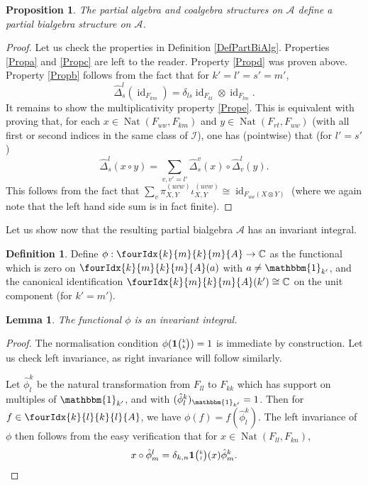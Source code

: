 \documentclass[10pt]{article}
\DeclareMathOperator{\id}{id}
\DeclareMathOperator{\Nat}{\mathrm{Nat}}
\newcommand{\C}{\mathbb{C}}
\newcommand{\Grt}[3]{#1{\tiny{\begin{pmatrix} #2\\#3\end{pmatrix}}}}
\newcommand{\Unitb}{\mathbbm{1}}
\newcommand{\UnitC}[2]{\Grt{\mathbf{1}}{#1}{#2}}
\newcommand{\Gr}[5]{\fourIdx{#2}{#4}{#3}{#5}{#1}}%
\newtheorem{Lem}[Theorem]{Lemma}
\newtheorem{Prop}[Theorem]{Proposition}
\theoremstyle{definition}
\newtheorem{Def}[Theorem]{Definition}
\numberwithin{equation}{section}
\begin{document}
\begin{Prop} The partial algebra and coalgebra structures on $\mathscr{A}$ define a partial bialgebra structure on $\mathscr{A}$. 
\end{Prop}
\begin{proof} Let us check the properties in Definition \ref{DefPartBiAlg}. Properties \ref{Propa} and \ref{Propc} are left to the reader. Property \ref{Propd} was proven above. Property \ref{Propb} follows from the fact that for $k'=l'=s'=m'$, \[\hat{\Delta}^{l}_s(\id_{F_{km}}) = \delta_{ls} \id_{F_{kl}}\otimes \id_{F_{lm}}.\] 
It remains to show the multiplicativity property \ref{Prope}. This is equivalent with proving that, for each $x\in \Nat(F_{uw},F_{km})$ and $y\in \Nat(F_{rt},F_{uw})$ (with all first or second indices in the same class of $\mathscr{I}$), one has (pointwise) that (for $l'=s'$) \[ \hat{\Delta}^l_s(x\circ y) = \sum_{v,v'=l'} \hat{\Delta}^v_s(x)\circ \hat{\Delta}^l_v(y).\] This follows from the fact that $\sum_v \pi^{(uvw)}_{X,Y}\iota^{(uvw)}_{X,Y} \cong \id_{F_{uw}(X\otimes Y)}$ (where we again note that the left hand side sum is in fact finite).
\end{proof} 

Let us show now that the resulting partial bialgebra $\mathscr{A}$ has an invariant integral.

\begin{Def} Define $\phi: \Gr{A}{k}{k}{m}{m} \rightarrow \C$ as the functional which is zero on $\Gr{A}{k}{k}{m}{m}(a)$ with $a\neq \Unitb_{k'}$, and the canonical identification $\Gr{A}{k}{k}{m}{m}(k')\cong \C$ on the unit component (for $k'=m'$).
\end{Def}

\begin{Lem} The functional $\phi$ is an invariant integral.
\end{Lem}

\begin{proof} The normalisation condition $\phi(\UnitC{k}{k})=1$ is immediate by construction. Let us check left invariance, as right invariance will follow similarly.

Let $\hat{\phi}^k_l$ be the natural transformation from $F_{ll}$ to $F_{kk}$ which has support on multiples of $\Unitb_{k'}$, and with $(\hat{\phi}^k_l)_{\Unitb_{k'}} = 1$.  Then for $f\in \Gr{A}{k}{k}{l}{l}$, we have $\phi(f) = f(\hat{\phi}^k_l)$. The left invariance of $\phi$ then follows from the easy verification that for $x\in \Nat(F_{ll},F_{kn})$, \[x\circ \hat{\phi}^l_m =\delta_{k,n} \UnitC{k}{l}(x)\hat{\phi}^k_m.\] 
\end{proof}
\end{document}
